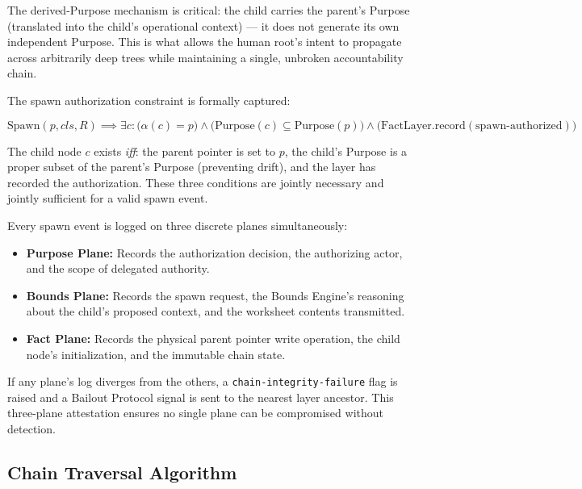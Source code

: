 The derived-Purpose mechanism is critical: the child carries the parent's Purpose (translated into the child's operational context) — it does not generate its own independent Purpose. This is what allows the human root's intent to propagate across arbitrarily deep trees while maintaining a single, unbroken accountability chain.

The spawn authorization constraint is formally captured:

\begin{equation}
\text{Spawn}(p, cls, R) \implies \exists c: \bigl(\alpha(c) = p\bigr) \land \bigl(\text{Purpose}(c) \subseteq \text{Purpose}(p)\bigr) \land \bigl(\text{FactLayer.record}(\text{spawn-authorized})\bigr)
\tag{SP-1}
\end{equation}

The child node $c$ exists \emph{iff}: the parent pointer is set to $p$, the child's Purpose is a proper subset of the parent's Purpose (preventing drift), and the \fact{} layer has recorded the authorization. These three conditions are jointly necessary and jointly sufficient for a valid spawn event.

Every spawn event is logged on three discrete planes simultaneously:

\begin{itemize}
\item \textbf{Purpose Plane:} Records the authorization decision, the authorizing actor, and the scope of delegated authority.
\item \textbf{Bounds Plane:} Records the spawn request, the Bounds Engine's reasoning about the child's proposed context, and the worksheet contents transmitted.
\item \textbf{Fact Plane:} Records the physical parent pointer write operation, the child node's initialization, and the immutable chain state.
\end{itemize}

If any plane's log diverges from the others, a \texttt{chain-integrity-failure} flag is raised and a Bailout Protocol signal is sent to the nearest \purpose{} layer ancestor. This three-plane attestation ensures no single plane can be compromised without detection.

\subsection{Chain Traversal Algorithm}
\label{sec:chain-traversal-algorithm}


